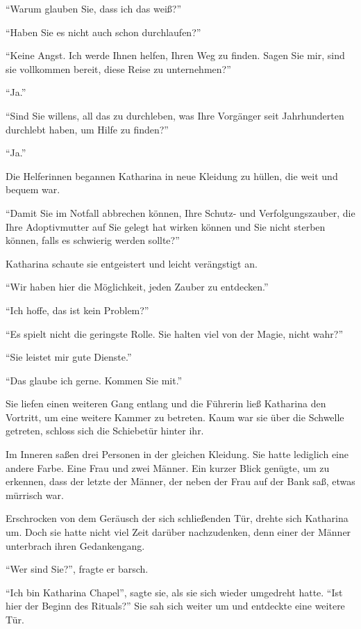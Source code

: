 \enquote{Warum glauben Sie, dass ich das weiß?}

\enquote{Haben Sie es nicht auch schon durchlaufen?}

\enquote{Keine Angst. Ich werde Ihnen helfen, Ihren Weg zu finden. \gst Sagen Sie mir, sind sie vollkommen bereit, diese Reise zu unternehmen?}

\enquote{Ja.}

\enquote{Sind Sie willens, all das zu durchleben, was Ihre Vorgänger seit Jahrhunderten durchlebt haben, um Hilfe zu finden?}

\enquote{Ja.}

Die Helferinnen begannen Katharina in neue Kleidung zu hüllen, die weit und bequem war.

\enquote{Damit Sie im Notfall abbrechen können, Ihre Schutz- und Verfolgungszauber, die Ihre Adoptivmutter auf Sie gelegt hat wirken können und Sie nicht sterben können, falls es schwierig werden sollte?}

Katharina schaute sie entgeistert und leicht verängstigt an.

\enquote{Wir haben hier die Möglichkeit, jeden Zauber zu entdecken.}

\enquote{Ich hoffe, das ist kein Problem?}

\enquote{Es spielt nicht die geringste Rolle. \gst Sie halten viel von der Magie, nicht wahr?}

\enquote{Sie leistet mir gute Dienste.}

\enquote{Das glaube ich gerne. \gst Kommen Sie mit.}

Sie liefen einen weiteren Gang entlang und die Führerin ließ Katharina den Vortritt, um eine weitere Kammer zu betreten. Kaum war sie über die Schwelle getreten, schloss sich die Schiebetür hinter ihr.

Im Inneren saßen drei Personen in der gleichen Kleidung. Sie hatte lediglich eine andere Farbe. Eine Frau und zwei Männer. Ein kurzer Blick genügte, um zu erkennen, dass der letzte der Männer, der neben der Frau auf der Bank saß, etwas mürrisch war.

Erschrocken von dem Geräusch der sich schließenden Tür, drehte sich Katharina um. Doch sie hatte nicht viel Zeit darüber nachzudenken, denn einer der Männer unterbrach ihren Gedankengang.

\enquote{Wer sind Sie?}, fragte er barsch.

\enquote{Ich bin Katharina Chapel}, sagte sie, als sie sich wieder umgedreht hatte. \enquote{Ist hier der Beginn des Rituals?} Sie sah sich weiter um und entdeckte eine weitere Tür.


